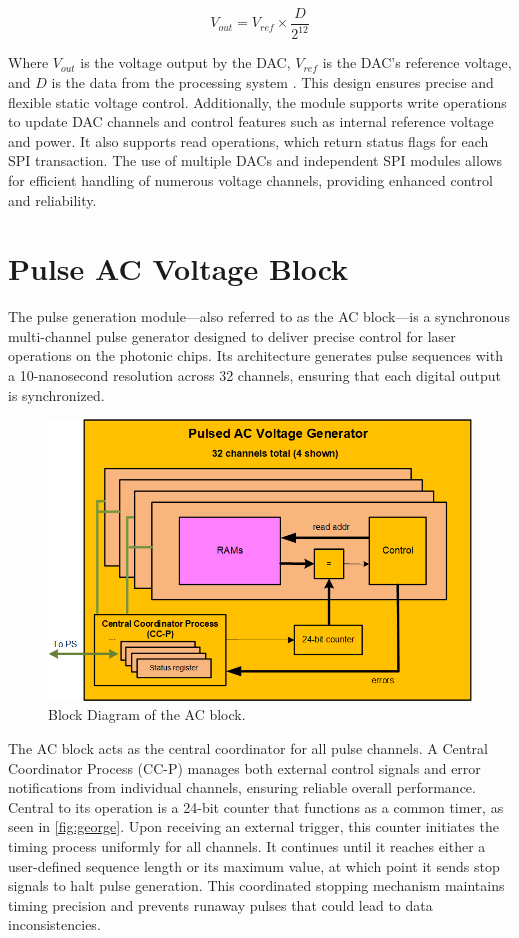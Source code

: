 \begin{equation}
V_{out} = V_{ref} \times \frac{D}{2^{12}}
\end{equation}

Where $V_{out}$ is the voltage output by the DAC, $V_{ref}$ is the DAC's reference voltage, and $D$ is the data from the processing system \cite{ad5628}. This design ensures precise and flexible static voltage control. Additionally, the module supports write operations to update DAC channels and control features such as internal reference voltage and power. It also supports read operations, which return status flags for each SPI transaction. The use of multiple DACs and independent SPI modules allows for efficient handling of numerous voltage channels, providing enhanced control and reliability.

\section{Pulse AC Voltage Block}

The pulse generation module—also referred to as the AC block—is a synchronous multi-channel pulse generator designed to deliver precise control for laser operations on the photonic chips. Its architecture generates pulse sequences with a 10-nanosecond resolution across 32 channels, ensuring that each digital output is synchronized. 

\begin{figure}[h]
    \setlength{\abovecaptionskip}{5pt}    %
    \setlength{\belowcaptionskip}{5pt}    %
    \centering
    \includegraphics[width=0.8\linewidth]{figures/5.3.png}
    \caption{Block Diagram of the AC block.}
    \label{fig:george}
\end{figure}
The AC block acts as the central coordinator for all pulse channels. A Central Coordinator Process (CC-P) manages both external control signals and error notifications from individual channels, ensuring reliable overall performance. Central to its operation is a 24-bit counter that functions as a common timer, as seen in \autoref{fig:george}. Upon receiving an external trigger, this counter initiates the timing process uniformly for all channels. It continues until it reaches either a user-defined sequence length or its maximum value, at which point it sends stop signals to halt pulse generation. This coordinated stopping mechanism maintains timing precision and prevents runaway pulses that could lead to data inconsistencies.

